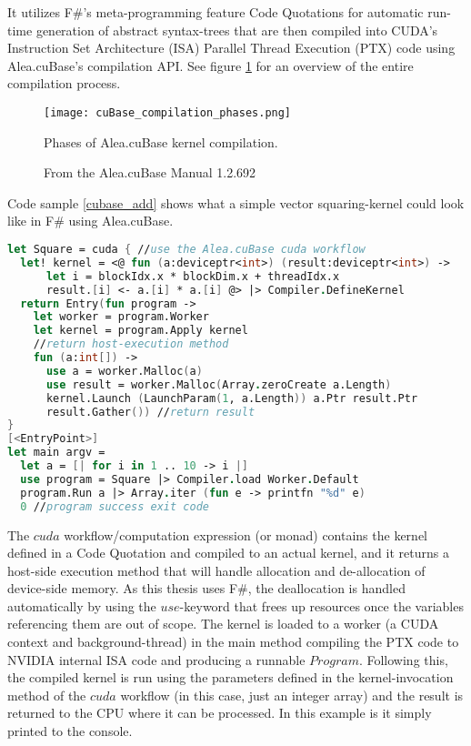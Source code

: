 It utilizes F\#'s meta-programming feature Code Quotations for automatic run-time generation of abstract syntax-trees that are then compiled into CUDA's Instruction Set Architecture (ISA) Parallel Thread Execution (PTX) code using Alea.cuBase's compilation API.
See figure \ref{fig:alea_cuBase_compilation} for an overview of the entire compilation process. %

\begin{figure}[h!]\centering
\texttt{[image: cuBase\_compilation\_phases.png]}
\caption{Phases of Alea.cuBase kernel compilation.\label{fig:alea_cuBase_compilation}}
\caption*{From the Alea.cuBase Manual 1.2.692\cite{quantalea}}
\end{figure}

Code sample \ref{cubase_add} shows what a simple vector squaring-kernel could look like in F\# using Alea.cuBase.

\begin{lstlisting}[caption=Alea.cuBase square kernel, label=cubase_add, language=FSharp]
let Square = cuda { //use the Alea.cuBase cuda workflow
  let! kernel = <@ fun (a:deviceptr<int>) (result:deviceptr<int>) ->
      let i = blockIdx.x * blockDim.x + threadIdx.x
      result.[i] <- a.[i] * a.[i] @> |> Compiler.DefineKernel
  return Entry(fun program ->
    let worker = program.Worker
    let kernel = program.Apply kernel
    //return host-execution method
    fun (a:int[]) ->
      use a = worker.Malloc(a)
      use result = worker.Malloc(Array.zeroCreate a.Length)
      kernel.Launch (LaunchParam(1, a.Length)) a.Ptr result.Ptr
      result.Gather()) //return result
}
[<EntryPoint>]
let main argv = 
  let a = [| for i in 1 .. 10 -> i |]
  use program = Square |> Compiler.load Worker.Default
  program.Run a |> Array.iter (fun e -> printfn "%d" e)
  0 //program success exit code
\end{lstlisting}

The $cuda$ workflow/computation expression (or monad) contains the kernel defined in a Code Quotation and compiled to an actual kernel, and it returns a host-side execution method that will handle allocation and de-allocation of device-side memory. 
As this thesis uses F\#, the deallocation is handled automatically by using the $use$-keyword that frees up resources once the variables referencing them are out of scope. 
The kernel is loaded to a worker (a CUDA context and background-thread) in the main method compiling the PTX code to NVIDIA internal ISA code and producing a runnable $Program$. 
Following this, the compiled kernel is run using the parameters defined in the kernel-invocation method of the $cuda$ workflow (in this case, just an integer array) and the result is returned to the CPU where it can be processed. 
In this example is it simply printed to the console. 



